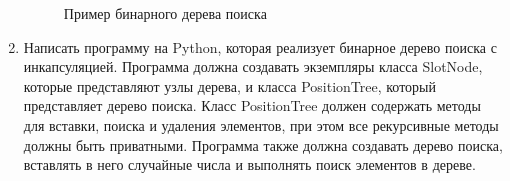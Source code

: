 \begin{enumerate}
\begin{figure}[h]
\centering
{}
\caption{Пример бинарного дерева поиска}
\end{figure}

\item Написать программу на Python, которая реализует бинарное дерево поиска с инкапсуляцией. Программа должна создавать экземпляры класса SlotNode, которые представляют узлы дерева, и класса PositionTree, который представляет дерево поиска. Класс PositionTree должен содержать методы для вставки, поиска и удаления элементов, при этом все рекурсивные методы должны быть приватными. Программа также должна создавать дерево поиска, вставлять в него случайные числа и выполнять поиск элементов в дереве.


\end{enumerate}
